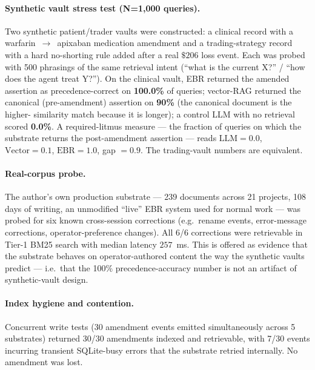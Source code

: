 \documentclass[11pt,a4paper]{article}
\begin{document}
\paragraph{Synthetic vault stress test (N=1{,}000 queries).}
Two synthetic patient/trader vaults were constructed: a clinical record with a
warfarin~$\to$~apixaban medication amendment and a trading-strategy record with a hard
no-shorting rule added after a real $\$206$ loss event. Each was probed with 500
phrasings of the same retrieval intent (``what is the current X?'' / ``how does the
agent treat Y?''). On the clinical vault, EBR returned the amended assertion as
precedence-correct on \textbf{100.0\%} of queries; vector-RAG returned the canonical
(pre-amendment) assertion on \textbf{90\%} (the canonical document is the higher-
similarity match because it is longer); a control LLM with no retrieval scored
\textbf{0.0\%}. A required-litmus measure --- the fraction of queries on which the
substrate returns the post-amendment assertion --- reads $\mathrm{LLM} = 0.0$,
$\mathrm{Vector} = 0.1$, $\mathrm{EBR} = 1.0$, gap $= 0.9$. The trading-vault numbers
are equivalent.

\paragraph{Real-corpus probe.}
The author's own production substrate --- 239 documents across 21 projects, 108 days
of writing, an unmodified ``live'' EBR system used for normal work --- was probed for
six known cross-session corrections (e.g.\ rename events, error-message corrections,
operator-preference changes). All 6/6 corrections were retrievable in Tier-1 BM25 search
with median latency $257$~ms. This is offered as evidence that the substrate behaves
on operator-authored content the way the synthetic vaults predict --- i.e.\ that the
100\% precedence-accuracy number is not an artifact of synthetic-vault design.

\paragraph{Index hygiene and contention.}
Concurrent write tests (30 amendment events emitted simultaneously across 5 substrates)
returned 30/30 amendments indexed and retrievable, with 7/30 events incurring transient
SQLite-busy errors that the substrate retried internally. No amendment was lost.
\end{document}
